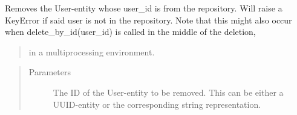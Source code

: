 \documentclass[letterpaper,10pt,english]{sphinxmanual}
\begin{document}
\begin{fulllineitems}
\label{\detokenize{pydash_app.user.repository:pydash_app.user.repository.delete_by_id}}
Removes the User-entity whose user\_id is  from the repository.
Will raise a KeyError if said user is not in the repository.
Note that this might also occur when delete\_by\_id(user\_id) is called in the middle of the deletion,
\begin{quote}

in a multiprocessing environment.
\end{quote}
\begin{quote}\begin{description}
\item[{Parameters}] \leavevmode
{} \textendash{} The ID of the User-entity to be removed. This can be either a UUID-entity or the corresponding
string representation.

\end{description}\end{quote}

%
\begin{sphinxVerbatim}[commandchars=\\\{\}]
    
  
  
\end{sphinxVerbatim}

\end{fulllineitems}
\end{document}
